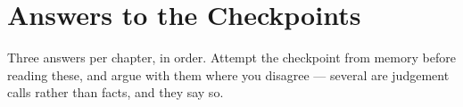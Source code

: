 \chapter{Answers to the Checkpoints}\label{app:answers}
\normalfigures

Three answers per chapter, in order. Attempt the checkpoint from memory before
reading these, and argue with them where you disagree --- several are judgement
calls rather than facts, and they say so.

\newcommand{\ansch}[1]{\subsection*{\color{primary}Chapter #1}}
\newenvironment{ans}
  {\begin{enumerate}[leftmargin=*, itemsep=4pt, topsep=3pt,
                     label=\textbf{\arabic*.}]}
  {\end{enumerate}}

